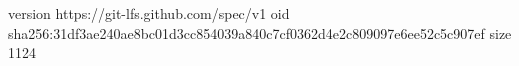 version https://git-lfs.github.com/spec/v1
oid sha256:31df3ae240ae8bc01d3cc854039a840c7cf0362d4e2c809097e6ee52c5c907ef
size 1124

